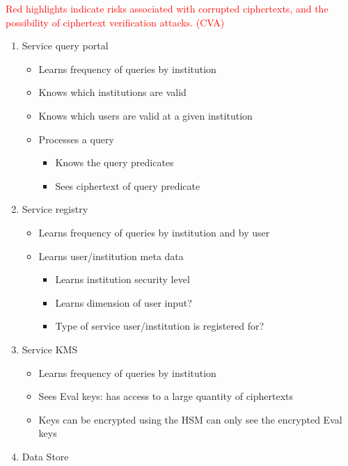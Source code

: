 \textcolor{red} {Red highlights indicate risks associated with corrupted ciphertexts, and the possibility of ciphertext verification attacks. (CVA)}
\begin{enumerate}
    \item Service query portal
          \begin{itemize}
              \item Learns frequency of queries by institution
              \item Knows which institutions are valid
              \item Knows which users are valid at a given institution
              \item Processes a query
                    \begin{itemize}
                        \item Knows the query predicates
                        \item Sees ciphertext of query predicate
                    \end{itemize}
          \end{itemize}
    \item Service registry
          \begin{itemize}
              \item Learns frequency of queries by institution and by user
              \item Learns user/institution meta data
                    \begin{itemize}
                        \item Learns institution security level
                        \item Learns dimension of user input?
                        \item Type of service user/institution is registered for?
                    \end{itemize}
          \end{itemize}
    \item Service KMS
          \begin{itemize}
              \item Learns frequency of queries by institution
              \item Sees Eval keys: has access to a large quantity of ciphertexts
              \item Keys can be encrypted using the HSM can only see the encrypted Eval keys
          \end{itemize}
    \item Data Store

\end{enumerate}
